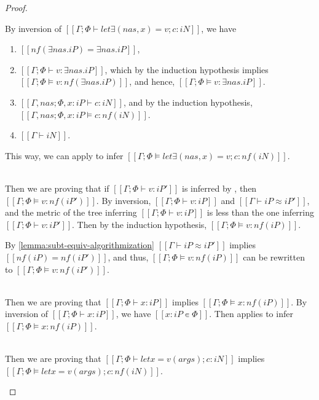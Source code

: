 \begin{proof}
\begin{caseof}
            By inversion of $[[Γ ; Φ ⊢ let∃ (nas, x) = v; c : iN]]$, we have
            \begin{enumerate}
                \item $[[nf(∃nas.iP) = ∃nas.iP]]$,
                \item $[[Γ ; Φ ⊢ v : ∃nas.iP]]$, 
                    which by the induction hypothesis implies 
                    $[[Γ ; Φ ⊨ v : nf(∃nas.iP)]]$, 
                    and hence, $[[Γ ; Φ ⊨ v : ∃nas.iP]]$.
                \item $[[Γ, nas ; Φ, x:iP ⊢ c : iN]]$,
                    and by the induction hypothesis, 
                    $[[Γ, nas ; Φ, x:iP ⊨ c : nf(iN)]]$.
                \item $[[Γ ⊢ iN]]$.
            \end{enumerate}
            
            This way, we can apply  to
            infer $[[Γ ; Φ ⊨ let∃ (nas, x) = v; c : nf(iN)]]$.

        \item {}\\
            Then we are proving that
            if $[[Γ; Φ ⊢ v : iP']]$ is inferred by ,
            then $[[Γ; Φ ⊨ v : nf(iP')]]$.
            By inversion, $[[Γ ; Φ ⊢ v : iP]]$ and $[[Γ ⊢ iP ≈ iP']]$,
            and the metric of the tree inferring $[[Γ ; Φ ⊢ v : iP]]$ is less than the one 
            inferring $[[Γ; Φ ⊢ v : iP']]$.
            Then by the induction hypothesis, $[[Γ; Φ ⊨ v : nf(iP)]]$.

            By \cref{lemma:subt-equiv-algorithmization}
            $[[Γ ⊢ iP ≈ iP']]$ implies $[[nf(iP) = nf(iP')]]$, and thus, 
            $[[Γ; Φ ⊨ v : nf(iP)]]$ can be rewritten to $[[Γ; Φ ⊨ v : nf(iP')]]$.

        \item {}\\
            Then we are proving that
            $[[Γ; Φ ⊢ x : iP]]$
            implies
            $[[Γ; Φ ⊨ x : nf(iP)]]$.
            By inversion of $[[Γ; Φ ⊢ x : iP]]$,
            we have $[[x : iP ∊ Φ ]]$.
            Then  applies to infer
            $[[Γ; Φ ⊨ x : nf(iP)]]$.

        \item {}\\
            Then we are proving that
            $[[Γ; Φ ⊢ let x = v(args); c : iN]]$
            implies
            $[[Γ; Φ ⊨ let x = v(args); c : nf(iN)]]$.


\end{caseof}
\end{proof}
